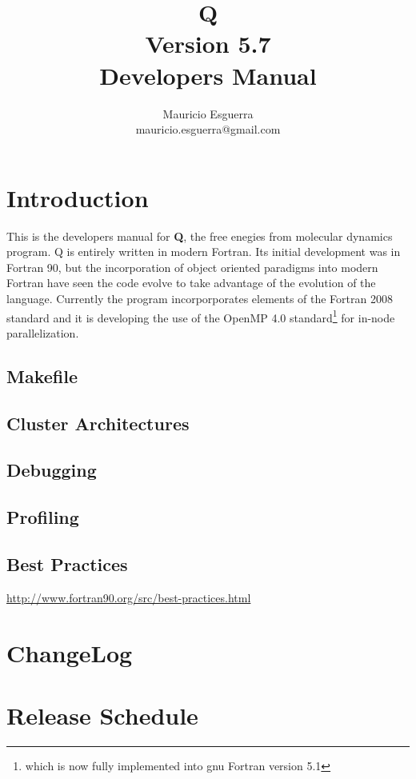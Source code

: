 \documentclass[10pt, oneside, pdftex]{article}
\title{Q\\
    \LARGE Version 5.7 \\
    \LARGE \vspace*{-10pt}Developers Manual\vspace*{10pt}}
\author{
  \vspace{10pt}
  Mauricio Esguerra \\
  \vspace{4pt}
  mauricio.esguerra@gmail.com \\
  \vspace{20pt}
  }
\makeatletter
\def\printtitle{
{\color{bl} \centering \Huge \textbf{\@title}\par}} %
\def\printauthor{                        %
{\centering \small \@author}}            %
\makeatother
\begin{document}
\printtitle
\printauthor
\tableofcontents
%

\vspace{20pt}
\section{Introduction}
This is  the developers manual  for \textbf{Q}, the free  enegies from
molecular dynamics program.  Q is  entirely written in modern Fortran.
Its initial  development was in  Fortran 90, but the  incorporation of
object  oriented paradigms  into  modern Fortran  have  seen the  code
evolve to take advantage of  the evolution of the language.  Currently
the program incorporporates elements of  the Fortran 2008 standard and
it is developing the use  of the OpenMP 4.0 standard\footnote{which is
now  fully implemented  into  gnu  Fortran version  5.1}  for in-node
parallelization.


\subsection{Makefile}
\label{makefile}


\subsection{Cluster Architectures}
\label{clusterarchitectures}


\subsection{Debugging}
\label{debugging}


\subsection{Profiling}
\label{profiling}

\subsection{Best Practices}
\label{bestpractices}

\url{http://www.fortran90.org/src/best-practices.html}


\section{ChangeLog}
\label{changelog}


\section{Release Schedule}
\label{schedule}
\end{document}
